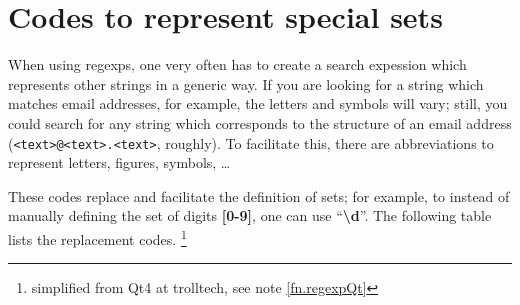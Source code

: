 \section{Codes to represent special sets}

When using regexps, one very often has to create a search expession which represents other strings in a generic way. If you are looking for a string which matches email addresses, for example, the letters and symbols will vary; still, you could search for any string which corresponds to the structure of an email address (\texttt{<text>@<text>.<text>}, roughly). To facilitate this, there are abbreviations to represent letters, figures, symbols, \dots 

These codes replace and facilitate the definition of sets; for example, to instead of manually defining the set of digits \textbf{[0-9]}, one can use ``\textbf{\textbackslash{}d}''. The following table lists the replacement codes. \footnote{simplified from Qt4 at trolltech, see note \label{trollnext}\ref{fn.regexpQt}}
\smallskip

